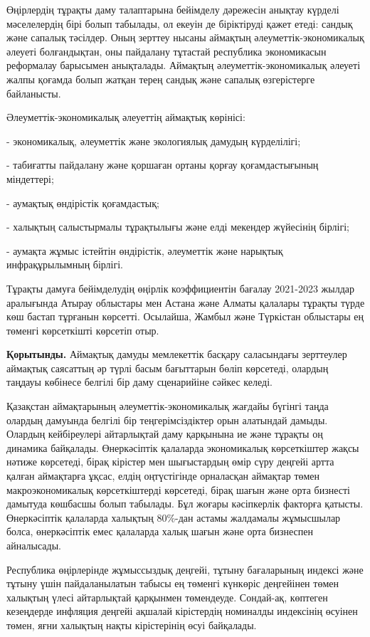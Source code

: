 \begin{multicols}{2}
Өңірлердің тұрақты даму талаптарына бейімделу дәрежесін анықтау күрделі
мәселелердің бірі болып табылады, ол екеуін де біріктіруді қажет етеді:
сандық және сапалық тәсілдер. Оның зерттеу нысаны аймақтың
әлеуметтік-экономикалық әлеуеті болғандықтан, оны пайдалану тұтастай
республика экономикасын реформалау барысымен анықталады. Аймақтың
әлеуметтік-экономикалық әлеуеті жалпы қоғамда болып жатқан терең сандық
және сапалық өзгерістерге байланысты.

Әлеуметтік-экономикалық әлеуеттің аймақтық көрінісі:

- экономикалық, әлеуметтік және экологиялық дамудың күрделілігі;

- табиғатты пайдалану және қоршаған ортаны қорғау қоғамдастығының
міндеттері;

- аумақтық өндірістік қоғамдастық;

- халықтың салыстырмалы тұрақтылығы және елді мекендер жүйесінің
бірлігі;

- аумақта жұмыс істейтін өндірістік, әлеуметтік және нарықтық
инфрақұрылымның бірлігі.

Тұрақты дамуға бейімделудің өңірлік коэффициентін бағалау 2021-2023
жылдар аралығында Атырау облыстары мен Астана және Алматы қалалары
тұрақты түрде көш бастап тұрғанын көрсетті. Осылайша, Жамбыл және
Түркістан облыстары ең төменгі көрсеткішті көрсетіп отыр.

{\bfseries Қорытынды.} Аймақтық дамуды мемлекеттік басқару саласындағы
зерттеулер аймақтық саясаттың әр түрлі басым бағыттарын бөліп көрсетеді,
олардың таңдауы көбінесе белгілі бір даму сценарийіне сәйкес келеді.

Қазақстан аймақтарының әлеуметтік-экономикалық жағдайы бүгінгі таңда
олардың дамуында белгілі бір теңгерімсіздіктер орын алатындай дамыды.
Олардың кейбіреулері айтарлықтай даму қарқынына ие және тұрақты оң
динамика байқалады. Өнеркәсіптік қалаларда экономикалық көрсеткіштер
жақсы нәтиже көрсетеді, бірақ кірістер мен шығыстардың өмір сүру деңгейі
артта қалған аймақтарға ұқсас, елдің оңтүстігінде орналасқан аймақтар
төмен макроэкономикалық көрсеткіштерді көрсетеді, бірақ шағын және орта
бизнесті дамытуда көшбасшы болып табылады. Бұл жоғары кәсіпкерлік
факторға қатысты. Өнеркәсіптік қалаларда халықтың 80\%-дан астамы
жалдамалы жұмысшылар болса, өнеркәсіптік емес қалаларда халық шағын және
орта бизнеспен айналысады.

Республика өңірлерінде жұмыссыздық деңгейі, тұтыну бағаларының индексі
және тұтыну үшін пайдаланылатын табысы ең төменгі күнкөріс деңгейінен
төмен халықтың үлесі айтарлықтай қарқынмен төмендеуде. Сондай-ақ,
көптеген кезеңдерде инфляция деңгейі ақшалай кірістердің номиналды
индексінің өсуінен төмен, яғни халықтың нақты кірістерінің өсуі
байқалады.


\end{multicols}
